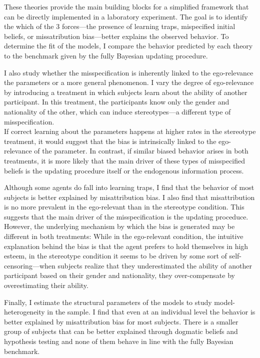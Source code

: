 \documentclass[
  12pt,
]{article}
\begin{document}
These theories provide the main building blocks for a simplified
framework that can be directly implemented in a laboratory experiment.
The goal is to identify the which of the 3 forces---the presence of
learning traps, mispecified initial beliefs, or missatribution
bias---better explains the observed behavior. To determine the fit of
the models, I compare the behavior predicted by each theory to the
benchmark given by the fully Bayesian updating procedure.

I also study whether the misspecification is inherently linked to the
ego-relevance the parameters or a more general phenomenon. I vary the
degree of ego-relevance by introducing a treatment in which subjects
learn about the ability of another participant. In this treatment, the
participants know only the gender and nationality of the other, which
can induce stereotypes---a different type of misspecification.\\
If correct learning about the parameters happens at higher rates in the
stereotype treatment, it would suggest that the bias is intrinsically
linked to the ego-relevance of the parameter. In contrast, if similar
biased behavior arises in both treatments, it is more likely that the
main driver of these types of misspecified beliefs is the updating
procedure itself or the endogenous information process.

Although some agents do fall into learning traps, I find that the
behavior of most subjects is better explained by misattribution bias. I
also find that misattribution is no more prevalent in the ego-relevant
than in the stereotype condition. This suggests that the main driver of
the misspecification is the updating proceduce. However, the underlying
mechanism by which the bias is generated may be different in both
treatments: While in the ego-relevant condition, the intuitive
explanation behind the bias is that the agent prefers to hold themselves
in high esteem, in the stereotype condition it seems to be driven by
some sort of self-censoring---when subjects realize that they
underestimated the ability of another participant based on their gender
and nationality, they over-compensate by overestimating their ability.

Finally, I estimate the structural parameters of the models to study
model-heterogeneity in the sample. I find that even at an individual
level the behavior is better explained by misattribution bias for most
subjects. There is a smaller group of subjects that can be better
explained through dogmatic beliefs and hypothesis testing and none of
them behave in line with the fully Bayesian benchmark.
\end{document}
